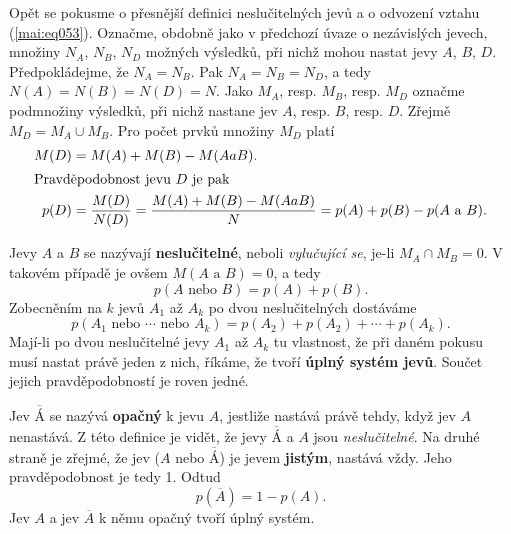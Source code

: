       Opět se pokusme o přesnější definici neslučitelných jevů a o odvození vztahu 
      (\ref{mai:eq053}). Označme, obdobně jako v předchozí úvaze o nezávislých jevech, množiny 
      \(N_A\), \(N_B\), \(N_D\) možných výsledků, při nichž mohou nastat jevy \(A\), \(B\), \(D\). 
      Předpokládejme, že \(N_A = N_B\). Pak \(N_A = N_B = N_D\), a tedy \(N(A) = N(B) = N(D) = N\). 
      Jako \(M_A\), resp. \(M_B\), resp. \(M_D\) označme podmnožiny výsledků, při nichž nastane jev 
      \(A\), resp. \(B\), resp. \(D\). Zřejmě \(M_D = M_A \cup M_B\). Pro počet prvků množiny 
      \(M_D\) platí 
      \begin{align*}
        M(D) &= M(A) + M(B) - M(A a B).                                    \\
        \shortintertext{Pravděpodobnost jevu \(D\) je pak}
        p(D) &= \dfrac{M(D)}{N(D)} = \dfrac{M(A) + M(B) - M(A a B)}{N} 
              = p(A) + p(B) - p(A\text{ a }B).
      \end{align*}
      
      Jevy \(A\) a \(B\) se nazývají \textbf{neslučitelné}, neboli \emph{vylučující se}, je-li 
      \(M_A \cap M_B = 0\). V takovém případě je ovšem \(M(A\text{ a }B) = 0\), a tedy
      \begin{equation*}
        p(A\text{ nebo }B) = p(A) + p(B).
      \end{equation*}
      Zobecněním na \(k\) jevů \(A_1\) až \(A_k\) po dvou neslučitelných dostáváme
      \begin{equation*}
        p(A_1\text{ nebo }\cdots\text{ nebo }A_k) = p(A_2) + p(A_2) + \cdots + p(A_k).
      \end{equation*}
      Mají-li po dvou neslučitelné jevy \(A_1\) až \(A_k\) tu vlastnost, že při daném pokusu musí 
      nastat právě jeden z nich, říkáme, že tvoří \textbf{úplný systém jevů}. Součet jejich 
      pravděpodobností je roven jedné.
      
      Jev \(\overline{Á}\) se nazývá \textbf{opačný} k jevu \(A\), jestliže nastává právě tehdy, 
      když jev \(A\) nenastává. Z této definice je vidět, že jevy \(\overline{Á}\) a \(A\) jsou 
      \emph{neslučitelné}. Na druhé straně je zřejmé, že jev (\(A\) nebo \(\overline{Á}\)) je jevem 
      \textbf{jistým}, nastává vždy. Jeho pravděpodobnost je tedy \num{1}. Odtud
      \begin{equation}\label{mai:eq054}
        p(\overline{A}) = 1 - p(A).
      \end{equation}
      Jev \(A\) a jev \(\overline{A}\) k němu opačný tvoří úplný systém.
      
